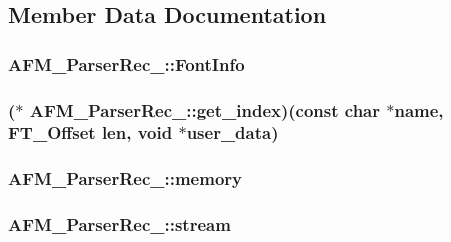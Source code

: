 \subsection{Member Data Documentation}
\hypertarget{struct_a_f_m___parser_rec___ae53d6cddac32a0eb7014c3a9f74517df}{
\subsubsection[{Font\-Info}]{ A\-F\-M\-\_\-\-Parser\-Rec\-\_\-\-::\-Font\-Info}}\label{struct_a_f_m___parser_rec___ae53d6cddac32a0eb7014c3a9f74517df}
\hypertarget{struct_a_f_m___parser_rec___a5f93c5c83d0957c19d3827071d90926f}{
\subsubsection[{get\-\_\-index}]{($\ast$ A\-F\-M\-\_\-\-Parser\-Rec\-\_\-\-::get\-\_\-index)(const char $\ast${\bf name}, {\bf F\-T\-\_\-\-Offset} {\bf len}, {\bf void} $\ast${\bf user\-\_\-data})}}\label{struct_a_f_m___parser_rec___a5f93c5c83d0957c19d3827071d90926f}
\hypertarget{struct_a_f_m___parser_rec___a3fec8b1760fa9261f48ee87dc2b3858b}{
\subsubsection[{memory}]{ A\-F\-M\-\_\-\-Parser\-Rec\-\_\-\-::memory}}\label{struct_a_f_m___parser_rec___a3fec8b1760fa9261f48ee87dc2b3858b}
\hypertarget{struct_a_f_m___parser_rec___adf3b1165216cbd1f7ec7ae736fd4270a}{
\subsubsection[{stream}]{ A\-F\-M\-\_\-\-Parser\-Rec\-\_\-\-::stream}}\label{struct_a_f_m___parser_rec___adf3b1165216cbd1f7ec7ae736fd4270a}
